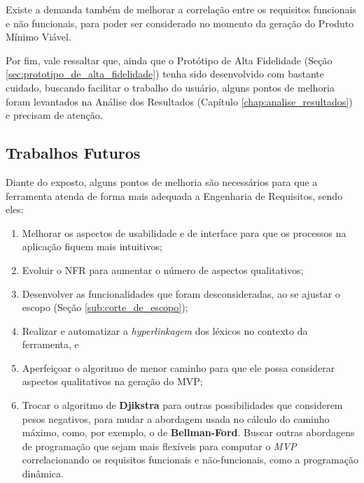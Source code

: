 Existe a demanda também de melhorar a correlação entre os requisitos funcionais e não funcionais, para poder ser considerado no momento da geração do Produto Mínimo Viável.

Por fim, vale ressaltar que, ainda que o Protótipo de Alta Fidelidade (Seção \ref{sec:prototipo_de_alta_fidelidade}) tenha sido desenvolvido com bastante cuidado, buscando facilitar o trabalho do usuário, alguns pontos de melhoria foram levantados na Análise dos Resultados (Capítulo \ref{chap:analise_resultados}) e precisam de atenção.

\subsection{Trabalhos Futuros}

Diante do exposto, alguns pontos de melhoria são necessários para que a ferramenta atenda de forma mais adequada a Engenharia de Requisitos, sendo eles:

\begin{enumerate}
    \item Melhorar os aspectos de usabilidade e de interface para que os processos na aplicação fiquem mais intuitivos;
    \item Evoluir o NFR para aumentar o número de aspectos qualitativos;
    \item Desenvolver as funcionalidades que foram desconsideradas, ao se ajustar o escopo (Seção \ref{sub:corte_de_escopo});
    \item Realizar e automatizar a \textit{hyperlinkagem} dos léxicos no contexto da ferramenta, e
    \item Aperfeiçoar o algoritmo de menor caminho para que ele possa considerar aspectos qualitativos na geração do MVP;
    \item Trocar o algoritmo de \textbf{Djikstra} para outras possibilidades que considerem pesos negativos, para mudar a abordagem usada no cálculo do caminho máximo, como, por exemplo, o de \textbf{Bellman-Ford}. Buscar outras abordagens de programação que sejam mais flexíveis para computar o \textit{MVP} correlacionando os requisitos funcionais e não-funcionais, como a programação dinâmica.
\end{enumerate}